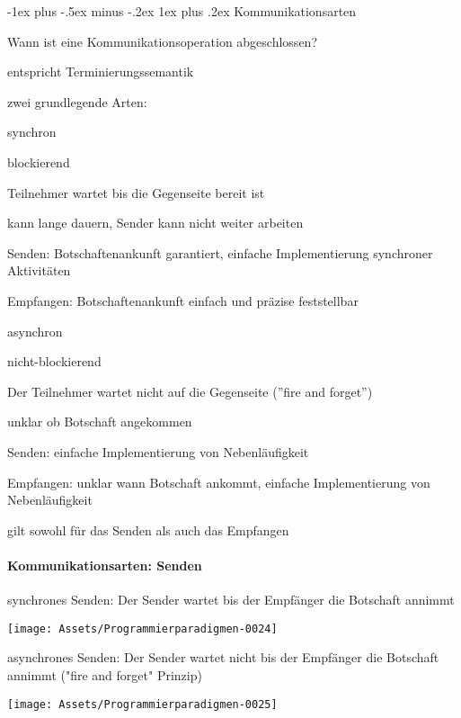 \documentclass[10pt]{article}
\makeatletter
\renewcommand{\subsubsection}{\@startsection{subsubsection}{3}{0mm}%
                                {-1ex plus -.5ex minus -.2ex}%
                                {1ex plus .2ex}%
                                {\normalfont\small\bfseries}}
\makeatother
\begin{document}
\subsubsection{Kommunikationsarten}
\begin{itemize*}
  \item Wann ist eine Kommunikationsoperation abgeschlossen?
  \item entspricht Terminierungssemantik
  \item zwei grundlegende Arten:
  \begin{itemize*}
    \item \color{orange} synchron \color{black}
    \begin{itemize*}
      \item blockierend
      \item Teilnehmer wartet bis die Gegenseite bereit ist
      \item kann lange dauern, Sender kann nicht weiter arbeiten
      \item Senden: Botschaftenankunft garantiert, einfache Implementierung synchroner Aktivitäten
      \item Empfangen: Botschaftenankunft einfach und präzise feststellbar
    \end{itemize*}
    \item \color{orange} asynchron \color{black}
    \begin{itemize*}
      \item nicht-blockierend
      \item Der Teilnehmer wartet nicht auf die Gegenseite (”fire and forget”)
      \item unklar ob Botschaft angekommen
      \item Senden: einfache Implementierung von Nebenläufigkeit
      \item Empfangen: unklar wann Botschaft ankommt, einfache Implementierung von Nebenläufigkeit
    \end{itemize*}
    \item gilt sowohl für das Senden als auch das Empfangen
  \end{itemize*}
\end{itemize*}

\paragraph{Kommunikationsarten: Senden}
\color{orange} synchrones Senden: \color{black} Der Sender wartet bis der Empfänger die Botschaft annimmt
\begin{center}
  \centering
  \texttt{[image: Assets/Programmierparadigmen-0024]}
\end{center}
\noindent \color{orange} asynchrones Senden: \color{black} Der Sender wartet nicht bis der Empfänger die Botschaft annimmt ("fire and forget" Prinzip)
\begin{center}
  \centering
  \texttt{[image: Assets/Programmierparadigmen-0025]}
\end{center}
\end{document}
